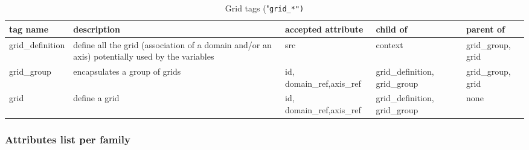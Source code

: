 \documentclass[../main/NEMO_manual]{subfiles}
\begin{document}
\begin{table}
  \scriptsize
  \begin{tabularx}{\textwidth}{|l|X|X|X|X|}
    \hline
    tag name                                                                                     &
    description                                                                                  &
    accepted attribute                                                                           &
    child of                                                                                     &
    parent of                       \\
    \hline
    \hline
    grid\_definition                                                                               &
    define all the grid (association of a domain and/or an axis) potentially used by the variables &
    src                                                                                            &
    context                                                                                        &
    grid\_group, grid	\\
    \hline
    grid\_group                                                                                    &
    encapsulates a group of grids                                                                  &
    id, domain\_ref,axis\_ref                                                                      &
    grid\_definition, grid\_group                                                                  &
    grid\_group, grid	\\
    \hline
    grid                                                                                           &
    define a grid                                                                                  &
    id, domain\_ref,axis\_ref                                                                      &
    grid\_definition, grid\_group                                                                  &
    none 					\\
    \hline
  \end{tabularx}
  \caption{Grid tags ("\tt{grid\_*}")}
\end{table}

\subsubsection{Attributes list per family}
\end{document}
